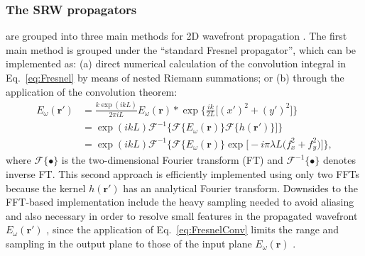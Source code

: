 \documentclass{iucr}              %
\begin{document}
\subsubsection{The SRW propagators}
 are grouped into three main methods for 2D wavefront propagation \cite{SRWgit}. The first main method is grouped under the ``standard Fresnel propagator'', which can be implemented as: (a) direct numerical calculation of the convolution integral in Eq.~\ref{eq:Fresnel} by means of nested Riemann summations; or (b) through the application of the convolution theorem:
 \begin{equation}\label{eq:FresnelConv}
\begin{split}
    E_\omega(\textbf{r}')&=\frac{k\exp{(ikL)}}{2\pi i L} E_\omega(\textbf{r}) * \exp{\bigg\{ \frac{ik}{2L}\big[ (x')^2 + (y')^2 \big]\bigg\}}\\
   &= \exp{(ikL)}\mathcal{F}^{-1}\big\{\mathcal{F}\{E_\omega(\textbf{r})\}\mathcal{F}\{h(\textbf{r}')\}\big]\}\\
   &=\exp{(ikL)}\mathcal{F}^{-1}\big\{\mathcal{F}\{E_\omega(\textbf{r})\}\exp\big[-i\pi\lambda L\big(f_x^2+f_y^2\big)\big]\},
\end{split}
\end{equation}
where $\mathcal{F}\{\bullet\}$ is the two-dimensional Fourier transform (FT) and $\mathcal{F}^{-1}\{\bullet\}$ denotes inverse FT. This second approach is efficiently implemented using only two FFTs because the kernel $h(\textbf{r}')$ has an analytical Fourier transform. Downsides to the FFT-based implementation include the heavy sampling needed to avoid aliasing and also necessary in order to resolve small features in the propagated wavefront $ E_\omega(\textbf{r}')$ , since the application of Eq.~\ref{eq:FresnelConv} limits the range and sampling in the output plane to those of the input plane $ E_\omega(\textbf{r})$ \cite{Kelly2014}.
\end{document}
